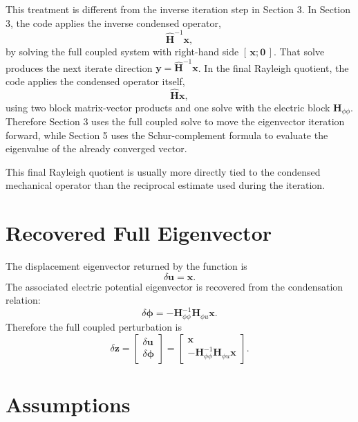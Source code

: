 \documentclass[11pt]{article}
\begin{document}
This treatment is different from the inverse iteration step in Section
3. In Section 3, the code applies the inverse condensed operator,
\[
    \widehat{\bm H}^{-1}\bm x,
\]
by solving the full coupled system with right-hand side
\([\,\bm x;\bm 0\,]\). That solve produces the next iterate direction
\(\bm y=\widehat{\bm H}^{-1}\bm x\). In the final Rayleigh quotient, the
code applies the condensed operator itself,
\[
    \widehat{\bm H}\bm x,
\]
using two block matrix-vector products and one solve with the electric
block \(\bm H_{\phi\phi}\). Therefore Section 3 uses the full coupled
solve to move the eigenvector iteration forward, while Section 5 uses
the Schur-complement formula to evaluate the eigenvalue of the already
converged vector.

This final Rayleigh quotient is usually more directly tied to the
condensed mechanical operator than the reciprocal estimate used during
the iteration.

\section{Recovered Full Eigenvector}

The displacement eigenvector returned by the function is
\[
    \delta \bm u = \bm x.
\]
The associated electric potential eigenvector is recovered from the
condensation relation:
\[
    \delta \bm \phi
    =
    -\bm H_{\phi\phi}^{-1}
    \bm H_{\phi u}\bm x.
\]
Therefore the full coupled perturbation is
\[
    \delta \bm z =
    \begin{bmatrix}
        \delta \bm u \\
        \delta \bm \phi
    \end{bmatrix}
    =
    \begin{bmatrix}
        \bm x \\
        -\bm H_{\phi\phi}^{-1}\bm H_{\phi u}\bm x
    \end{bmatrix}.
\]

\section{Assumptions}
\end{document}
